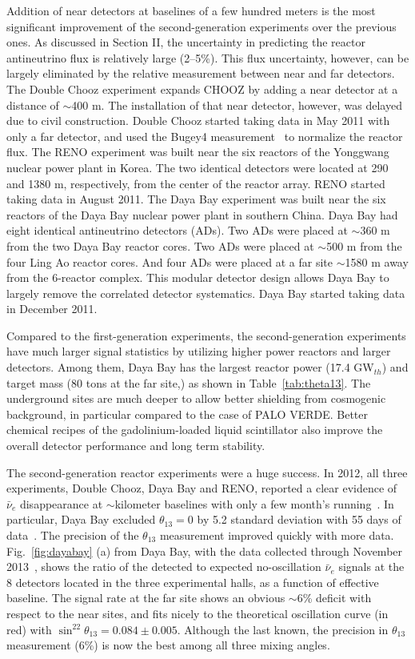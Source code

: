 \documentclass[aps,twocolumn,preprintnumbers,amsmath,superscriptaddress,amssymb,floats,nofootinbib]{revtex4-1}
\begin{document}
Addition of near detectors at baselines of a few hundred meters is the most significant improvement of the second-generation experiments over the previous ones.
As discussed in Section II, the uncertainty in predicting the reactor antineutrino flux is relatively large (2--5\%). 
This flux uncertainty, however, can be largely eliminated by the relative measurement between near and far detectors. 
The Double Chooz experiment expands CHOOZ by adding a near detector at a distance of $\sim$400 m. 
The installation of that near detector, however, was delayed due to civil construction. 
Double Chooz started taking data in May 2011 with only a far detector, and used the Bugey4 measurement~\cite{Bugey4} to normalize the reactor flux. 
The RENO experiment was built near the six reactors of the Yonggwang nuclear power plant in Korea. 
The two identical detectors were located at 290 and 1380 m, respectively, from the center of the reactor array. 
RENO started taking data in August 2011. 
The Daya Bay experiment was built near the six reactors of the Daya Bay nuclear power plant in southern China. 
Daya Bay had eight identical antineutrino detectors (ADs). 
Two ADs were placed at $\sim$360 m from the two  Daya Bay reactor cores. 
Two ADs were placed at $\sim$500 m from the four Ling Ao reactor cores. 
And four ADs were placed at a far site $\sim$1580 m away from the 6-reactor complex. 
This modular detector design allows Daya Bay to largely remove the correlated detector systematics. 
Daya Bay started taking data in December 2011.

Compared to the first-generation experiments, the second-generation experiments have much larger signal statistics by utilizing higher power reactors and larger detectors. Among them, Daya Bay has the largest reactor power (17.4 GW$_{th}$) and target mass (80 tons at the far site,) as shown in Table~\ref{tab:theta13}. 
The underground sites are much deeper to allow better shielding from cosmogenic background, in particular compared to the case of PALO VERDE. 
Better chemical recipes of the gadolinium-loaded liquid scintillator also improve the overall detector performance and long term stability.

The second-generation reactor experiments were a huge success. 
In 2012, all three experiments, Double Chooz, Daya Bay and RENO, reported 
a clear evidence of $\bar\nu_{e}$ disappearance at $\sim$kilometer baselines with only a few month's running~\cite{DChooz,Reno,Dayabay}. 
In particular, Daya Bay excluded $\theta_{13}=0$ by 5.2 standard deviation with 55 days of data~\cite{Dayabay}. 
The precision of the $\theta_{13}$ measurement improved quickly with more data.
Fig.~\ref{fig:dayabay} (a) from Daya Bay, with the data collected through November 2013~\cite{Zhang-Neutrino14}, shows the ratio of the detected to expected no-oscillation $\bar\nu_{e}$ signals at the 8 detectors located in the three experimental halls, as a function of effective baseline.
The signal rate at the far site shows an obvious
$\sim$6\% deficit with respect to the near sites, and fits nicely to the theoretical oscillation curve (in red) with $\sin^22\theta_{13} = 0.084 \pm 0.005$. 
Although the last known, the precision in $\theta_{13}$ measurement (6\%) is now the best among all three mixing angles.
\end{document}

